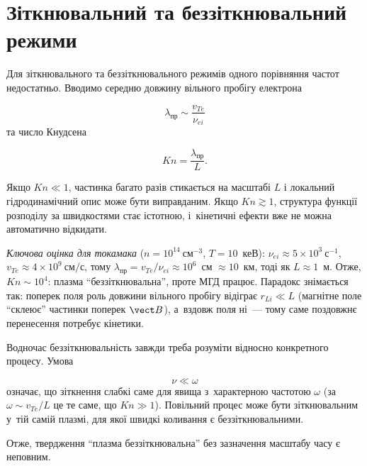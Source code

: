 \section{Зіткнювальний та беззіткнювальний режими}

Для зіткнювального та беззіткнювального режимів одного порівняння
частот недостатньо. Вводимо середню довжину вільного пробігу електрона

\begin{equation*}
\lambda_{\mathrm{пр}}\sim\frac{v_{Te}}{\nu_{ei}}
\end{equation*}
%
та число Кнудсена

\begin{equation}
Kn=\frac{\lambda_{\mathrm{пр}}}{L}.
\label{eq:plasma-knudsen}
\end{equation}

Якщо $Kn\ll1$, частинка багато разів стикається на масштабі $L$ і
локальний гідродинамічний опис може бути виправданим. Якщо
$Kn\gtrsim1$, структура функції розподілу за швидкостями стає
істотною, і~кінетичні ефекти вже не можна автоматично відкидати.

\emph{Ключова оцінка для токамака} ($n=10^{14}~\mathrm{см}^{-3}$, $T=10$~кеВ): $\nu_{ei}\approx5\times10^{3}~\mathrm{с}^{-1}$, $v_{Te}\approx4\times10^{9}~\mathrm{см/с}$,
тому $\lambda_{\mathrm{пр}}=v_{Te}/\nu_{ei}\approx10^6$~см $\approx10$~км, тоді як $L\approx1$~м. Отже, $Kn\sim10^4$: плазма \enquote{беззіткнювальна},
проте МГД працює. Парадокс знімається так: поперек поля роль довжини вільного пробігу відіграє $r_{Li}\ll L$ (магнітне поле \enquote{склеює} частинки поперек $\vect B$),
а~вздовж поля ні~--- тому саме поздовжнє перенесення потребує кінетики.

Водночас беззіткнювальність завжди треба розуміти відносно
конкретного процесу. Умова

\begin{equation*}
\nu\ll\omega
\end{equation*}
%
означає, що зіткнення слабкі саме для явища з~характерною частотою
$\omega$ (за $\omega\sim v_{Te}/L$ це те саме, що $Kn\gg1$). Повільний процес може бути зіткнювальним у~тій самій плазмі,
для якої швидкі коливання є беззіткнювальними.

Отже, твердження \enquote{плазма беззіткнювальна} без зазначення масштабу
часу є неповним.

